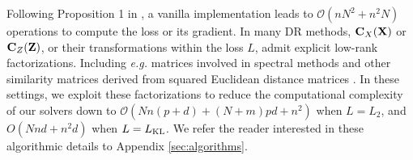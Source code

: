 Following Proposition 1 in \citep{peyre2016gromov}, a vanilla implementation leads to $\mathcal{O}(n N^2 + n^2N)$ operations to compute the loss or its gradient. In many DR methods, ${\mathbf{C}}_X({\mathbf{X}})$ or ${\mathbf{C}}_Z({\mathbf{Z}})$, or their transformations within the loss $L$, admit explicit low-rank factorizations. Including \emph{e.g.} matrices involved in spectral methods and other similarity matrices derived from squared Euclidean distance matrices \cite{scetbon2022linear}. In these settings, we exploit these factorizations to reduce the computational complexity of our solvers down to $\mathcal{O}(Nn(p + d) + (N + m)pd + n^2)$ when $L=L_2$, and $O(Nnd + n^2d)$ when $L = L_{\operatorname{KL}}$. We refer the reader interested in these algorithmic details to Appendix \ref{sec:algorithms}.


